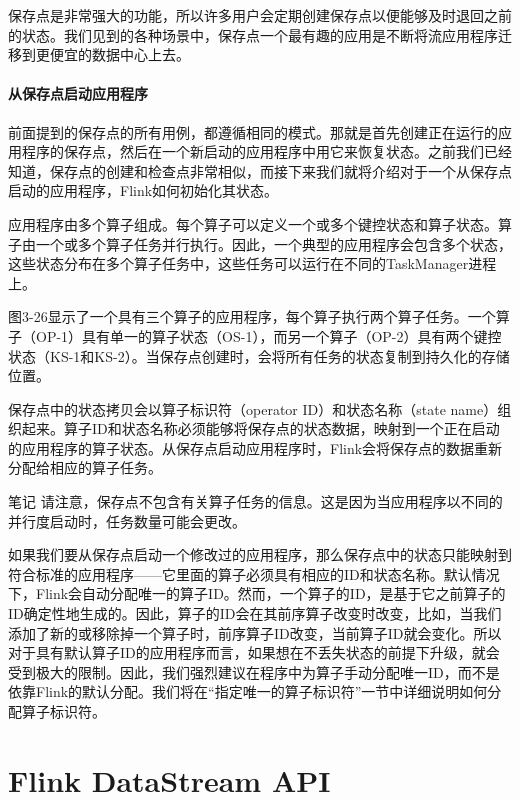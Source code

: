 \documentclass[oneside]{ctexbook}
\begin{document}
保存点是非常强大的功能，所以许多用户会定期创建保存点以便能够及时退回之前的状态。我们见到的各种场景中，保存点一个最有趣的应用是不断将流应用程序迁移到更便宜的数据中心上去。

\subsubsection{从保存点启动应用程序}

前面提到的保存点的所有用例，都遵循相同的模式。那就是首先创建正在运行的应用程序的保存点，然后在一个新启动的应用程序中用它来恢复状态。之前我们已经知道，保存点的创建和检查点非常相似，而接下来我们就将介绍对于一个从保存点启动的应用程序，Flink如何初始化其状态。

应用程序由多个算子组成。每个算子可以定义一个或多个键控状态和算子状态。算子由一个或多个算子任务并行执行。因此，一个典型的应用程序会包含多个状态，这些状态分布在多个算子任务中，这些任务可以运行在不同的TaskManager进程上。

图3-26显示了一个具有三个算子的应用程序，每个算子执行两个算子任务。一个算子（OP-1）具有单一的算子状态（OS-1），而另一个算子（OP-2）具有两个键控状态（KS-1和KS-2）。当保存点创建时，会将所有任务的状态复制到持久化的存储位置。

保存点中的状态拷贝会以算子标识符（operator ID）和状态名称（state name）组织起来。算子ID和状态名称必须能够将保存点的状态数据，映射到一个正在启动的应用程序的算子状态。从保存点启动应用程序时，Flink会将保存点的数据重新分配给相应的算子任务。

\begin{bclogo}[logo=\bcinfo, couleurBarre=orange, noborder=true, couleur=white]{笔记}
请注意，保存点不包含有关算子任务的信息。这是因为当应用程序以不同的并行度启动时，任务数量可能会更改。
\end{bclogo}

如果我们要从保存点启动一个修改过的应用程序，那么保存点中的状态只能映射到符合标准的应用程序——它里面的算子必须具有相应的ID和状态名称。默认情况下，Flink会自动分配唯一的算子ID。然而，一个算子的ID，是基于它之前算子的ID确定性地生成的。因此，算子的ID会在其前序算子改变时改变，比如，当我们添加了新的或移除掉一个算子时，前序算子ID改变，当前算子ID就会变化。所以对于具有默认算子ID的应用程序而言，如果想在不丢失状态的前提下升级，就会受到极大的限制。因此，我们强烈建议在程序中为算子手动分配唯一ID，而不是依靠Flink的默认分配。我们将在“指定唯一的算子标识符”一节中详细说明如何分配算子标识符。

\chapter{Flink DataStream API}
\end{document}
